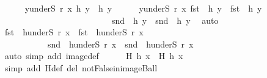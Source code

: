 \begin{isabellebody}
\ \ \ \ \isamarkupfalse%
\ {\isachardoublequoteopen}{\isasymforall}y{\isasymin}underS\ r\ x{\isachardot}{\kern0pt}\ h{}\ y\ {\isacharequal}{\kern0pt}\ h{}\ y{\isachardoublequoteclose}\isanewline
\ \ \ \ \isamarkupfalse%
\ {\isachardoublequoteopen}{\isasymforall}y{\isasymin}underS\ r\ x{\isachardot}{\kern0pt}\ {\isacharparenleft}{\kern0pt}fst\ {\isasymcirc}\ h{}{\isacharparenright}{\kern0pt}\ y\ {\isacharequal}{\kern0pt}\ {\isacharparenleft}{\kern0pt}fst\ {\isasymcirc}\ h{}{\isacharparenright}{\kern0pt}\ y\ {\isasymand}\isanewline
\ \ \ \ \ \ \ \ \ \ \ \ \ \ \ \ \ \ \ \ \ \ \ \ \ \ {\isacharparenleft}{\kern0pt}snd\ {\isasymcirc}\ h{}{\isacharparenright}{\kern0pt}\ y\ {\isacharequal}{\kern0pt}\ {\isacharparenleft}{\kern0pt}snd\ {\isasymcirc}\ h{}{\isacharparenright}{\kern0pt}\ y{\isachardoublequoteclose}\ \isamarkupfalse%
\ auto\isanewline
\ \ \ \ \isamarkupfalse%
\ {\isachardoublequoteopen}{\isacharparenleft}{\kern0pt}fst\ {\isasymcirc}\ h{}{\isacharparenright}{\kern0pt}{\isacharbackquote}{\kern0pt}{\isacharparenleft}{\kern0pt}underS\ r\ x{\isacharparenright}{\kern0pt}\ {\isacharequal}{\kern0pt}\ {\isacharparenleft}{\kern0pt}fst\ {\isasymcirc}\ h{}{\isacharparenright}{\kern0pt}{\isacharbackquote}{\kern0pt}{\isacharparenleft}{\kern0pt}underS\ r\ x{\isacharparenright}{\kern0pt}\ {\isasymand}\isanewline
\ \ \ \ \ \ \ \ \ \ \ {\isacharparenleft}{\kern0pt}snd\ {\isasymcirc}\ h{}{\isacharparenright}{\kern0pt}{\isacharbackquote}{\kern0pt}{\isacharparenleft}{\kern0pt}underS\ r\ x{\isacharparenright}{\kern0pt}\ {\isacharequal}{\kern0pt}\ {\isacharparenleft}{\kern0pt}snd\ {\isasymcirc}\ h{}{\isacharparenright}{\kern0pt}{\isacharbackquote}{\kern0pt}{\isacharparenleft}{\kern0pt}underS\ r\ x{\isacharparenright}{\kern0pt}{\isachardoublequoteclose}\isanewline
\ \ \ \ \ \ \isamarkupfalse%
\ {\isacharparenleft}{\kern0pt}auto\ simp\ add{\isacharcolon}{\kern0pt}\ image{\isacharunderscore}{\kern0pt}def{\isacharparenright}{\kern0pt}\isanewline
\ \ \ \ \isamarkupfalse%
\ {\isachardoublequoteopen}H\ h{}\ x\ {\isacharequal}{\kern0pt}\ H\ h{}\ x{\isachardoublequoteclose}\ \isamarkupfalse%
\ {\isacharparenleft}{\kern0pt}simp\ add{\isacharcolon}{\kern0pt}\ H{\isacharunderscore}{\kern0pt}def\ del{\isacharcolon}{\kern0pt}\ not{\isacharunderscore}{\kern0pt}False{\isacharunderscore}{\kern0pt}in{\isacharunderscore}{\kern0pt}image{\isacharunderscore}{\kern0pt}Ball{\isacharparenright}{\kern0pt}\isanewline

\end{isabellebody}
